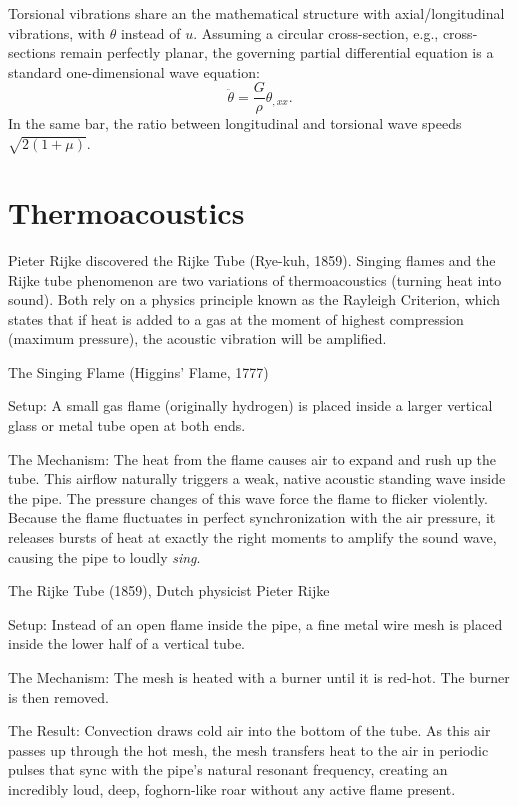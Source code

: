 Torsional vibrations share an the mathematical structure with
axial/longitudinal vibrations, with \(\theta\) instead of \(u\).
Assuming a circular cross-section, e.g., cross-sections remain perfectly
planar, the governing partial differential equation is a standard
one-dimensional wave equation:
\[
\ddot{\theta}=\frac{G}{\rho }\theta_{,xx}.
\]
In the same bar, the ratio between longitudinal and torsional wave speeds
\(\sqrt{2(1+\mu)}\).

\section{Thermoacoustics}\label{thermoacoustics}

Pieter Rijke discovered the Rijke Tube (Rye-kuh, 1859).
Singing flames and the Rijke tube phenomenon
are two variations of thermoacoustics (turning heat into sound).
Both rely on a physics principle known as the Rayleigh Criterion, which
states that if heat is added to a gas at the moment of highest
compression (maximum pressure), the acoustic vibration will be
amplified.

The Singing Flame (Higgins' Flame, 1777)

Setup: A small gas flame (originally hydrogen) is placed inside a larger
vertical glass or metal tube open at both ends.

The Mechanism: The heat from the flame causes air to expand and rush up
the tube. This airflow naturally triggers a weak, native acoustic
standing wave inside the pipe. The pressure changes of this wave force
the flame to flicker violently. Because the flame fluctuates in perfect
synchronization with the air pressure, it releases bursts of heat at
exactly the right moments to amplify the sound wave, causing the pipe to
loudly \textit{sing}.

The Rijke Tube (1859), Dutch physicist Pieter Rijke

Setup: Instead of an open flame inside the pipe, a fine metal wire mesh
is placed inside the lower half of a vertical tube.

The Mechanism: The mesh is heated with a burner until it is red-hot. The
burner is then removed.

The Result: Convection draws cold air into the bottom of the tube. As
this air passes up through the hot mesh, the mesh transfers heat to the
air in periodic pulses that sync with the pipe's natural resonant
frequency, creating an incredibly loud, deep, foghorn-like roar without
any active flame present.

